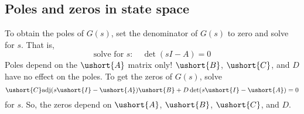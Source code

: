 \documentclass{book}
\newcommand{\adj}{\text{adj}}
\def\ubar#1{\ushort{#1}}
\begin{document}
\subsection*{Poles and zeros in state space}
To obtain the poles of $ G(s) $, set the denominator of $ G(s) $ to zero and solve for $ s $. That is,
\[ \text{solve for }s:\quad \det(sI-A)=0 \]
Poles depend on the $ \ubar{A} $ matrix only! $ \ubar{B} $, $ \ubar{C} $, and $ D $ have no effect on the poles. To get the zeros of $ G(s) $, solve
\[ \ubar{C}\adj(s\ubar{I}-\ubar{A})\ubar{B}+D\det(s\ubar{I}-\ubar{A}) = 0 \]
for $ s $. So, the zeros depend on $ \ubar{A} $, $ \ubar{B} $, $ \ubar{C} $, and $ D $.
\end{document}
